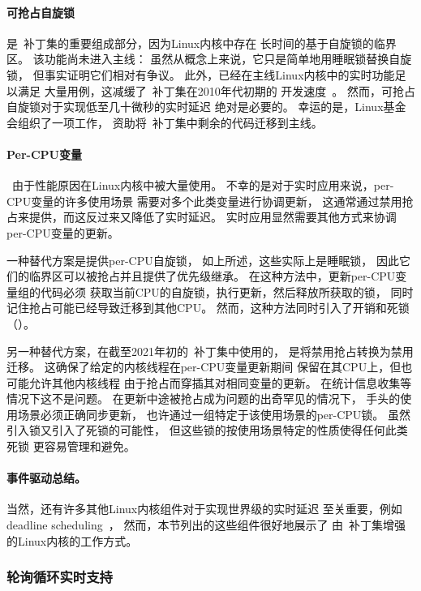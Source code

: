 \paragraph{可抢占自旋锁}
是\rt\ 补丁集的重要组成部分，因为Linux内核中存在
长时间的基于自旋锁的临界区。
该功能尚未进入主线：
虽然从概念上来说，它只是简单地用睡眠锁替换自旋锁，
但事实证明它们相对有争议。
此外，已经在主线Linux内核中的实时功能足以满足
大量用例，这减缓了\rt\ 补丁集在2010年代初期的
开发速度~\cite{JakeEdge2013Future-rtLinux,JakeEdge2014Future-rtLinux}。
然而，可抢占自旋锁对于实现低至几十微秒的实时延迟
绝对是必要的。
幸运的是，Linux基金会组织了一项工作，
资助将\rt\ 补丁集中剩余的代码迁移到主线。

\paragraph{Per-CPU变量}\ 由于性能原因在Linux内核中被大量使用。
不幸的是对于实时应用来说，per-CPU变量的许多使用场景
需要对多个此类变量进行协调更新，
这通常通过禁用抢占来提供，而这反过来又降低了实时延迟。
实时应用显然需要其他方式来协调per-CPU变量的更新。

一种替代方案是提供per-CPU自旋锁，
如上所述，这些实际上是睡眠锁，
因此它们的临界区可以被抢占并且提供了优先级继承。
在这种方法中，更新per-CPU变量组的代码必须
获取当前CPU的自旋锁，执行更新，然后释放所获取的锁，
同时记住抢占可能已经导致迁移到其他CPU。\@
然而，这种方法同时引入了开销和死锁（）。

另一种替代方案，在截至2021年初的\rt\ 补丁集中使用的，
是将禁用抢占转换为禁用迁移。
这确保了给定的内核线程在per-CPU变量更新期间
保留在其CPU上，但也可能允许其他内核线程
由于抢占而穿插其对相同变量的更新。
在统计信息收集等情况下这不是问题。
在更新中途被抢占成为问题的出奇罕见的情况下，
手头的使用场景必须正确同步更新，
也许通过一组特定于该使用场景的per-CPU锁。
虽然引入锁又引入了死锁的可能性，
但这些锁的按使用场景特定的性质使得任何此类死锁
更容易管理和避免。

\paragraph{事件驱动总结。}
当然，还有许多其他Linux内核组件对于实现世界级的实时延迟
至关重要，例如deadline
scheduling~\cite{DanielBristot2018deadlinesched-1,DanielBristot2018deadlinesched-2}，
然而，本节列出的这些组件很好地展示了
由\rt\ 补丁集增强的Linux内核的工作方式。

\subsubsection{轮询循环实时支持}
\label{sec:advsync:Polling-Loop Real-Time Support}

